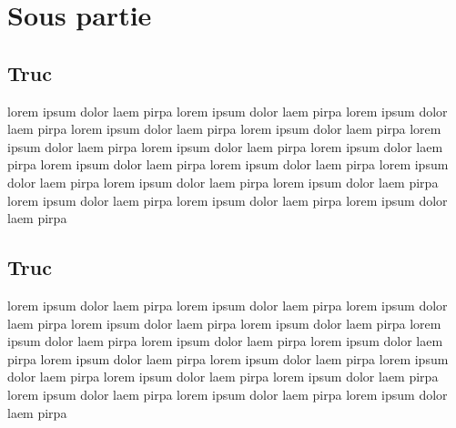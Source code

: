 \documentclass[11pt,fleqn]{book}
\begin{document}
\section{Sous partie}
\subsection{Truc}
lorem  ipsum  dolor  laem  pirpa  lorem  ipsum  dolor  laem  pirpa  lorem  ipsum  dolor  laem  pirpa  lorem  ipsum  dolor  laem  pirpa  lorem  ipsum  dolor  laem  pirpa  lorem  ipsum  dolor  laem  pirpa  lorem  ipsum  dolor  laem  pirpa  lorem  ipsum  dolor  laem  pirpa  lorem  ipsum  dolor  laem  pirpa  lorem  ipsum  dolor  laem  pirpa  lorem  ipsum  dolor  laem  pirpa  lorem  ipsum  dolor  laem  pirpa  lorem  ipsum  dolor  laem  pirpa  lorem  ipsum  dolor  laem  pirpa  lorem  ipsum  dolor  laem  pirpa  lorem  ipsum  dolor  laem  pirpa 
~\\
\subsection{Truc}
lorem  ipsum  dolor  laem  pirpa  lorem  ipsum  dolor  laem  pirpa  lorem  ipsum  dolor  laem  pirpa  lorem  ipsum  dolor  laem  pirpa  lorem  ipsum  dolor  laem  pirpa  lorem  ipsum  dolor  laem  pirpa  lorem  ipsum  dolor  laem  pirpa  lorem  ipsum  dolor  laem  pirpa  lorem  ipsum  dolor  laem  pirpa  lorem  ipsum  dolor  laem  pirpa  lorem  ipsum  dolor  laem  pirpa  lorem  ipsum  dolor  laem  pirpa  lorem  ipsum  dolor  laem  pirpa  lorem  ipsum  dolor  laem  pirpa  lorem  ipsum  dolor  laem  pirpa  lorem  ipsum  dolor  laem  pirpa 
~\\
\end{document}
